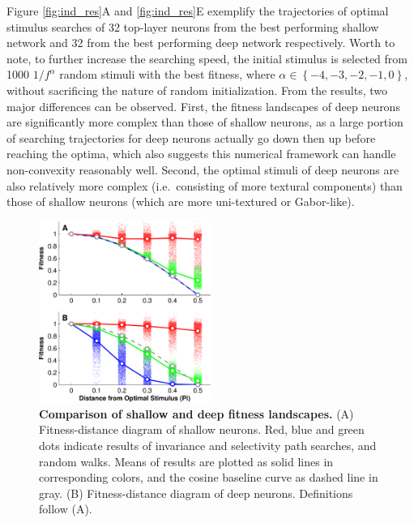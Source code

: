 Figure \ref{fig:ind_res}A and \ref{fig:ind_res}E exemplify the trajectories of optimal stimulus searches of 32 top-layer neurons from the best performing shallow network and 32 from the best performing deep network respectively. Worth to note, to further increase the searching speed, the initial stimulus is selected from 1000 ${1}/{f^{\alpha}}$ random stimuli with the best fitness, where $\alpha \in \left\lbrace -4,-3,-2,-1,0 \right\rbrace$, without sacrificing the nature of random initialization. From the results, two major differences can be observed. First, the fitness landscapes of deep neurons are significantly more complex than those of shallow neurons, as a large portion of searching trajectories for deep neurons actually go down then up before reaching the optima, which also suggests this numerical framework can handle non-convexity reasonably well. Second, the optimal stimuli of deep neurons are also relatively more complex (i.e.~consisting of more textural components) than those of shallow neurons (which are more uni-textured or Gabor-like).


\begin{figure}
\centering \includegraphics[width=0.5\textwidth]{Figs/e_fig3a_2-nup-crop.pdf}
\caption{
{\bf Comparison of shallow and deep fitness landscapes.} (A) Fitness-distance diagram of shallow neurons. Red, blue and green dots indicate results of invariance and selectivity path searches, and random walks. Means of results are plotted as solid lines in corresponding colors, and the cosine baseline curve as dashed line in gray. (B) Fitness-distance diagram of deep neurons. Definitions follow (A).}
\label{fig:ind_fdd} %
\end{figure}

